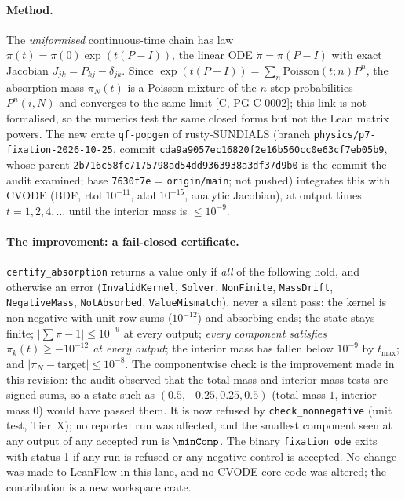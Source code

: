 \documentclass[11pt]{article}
\theoremstyle{remark}
\newcommand{\tier}[1]{\textsf{[#1]}}
\newcommand{\lean}[1]{\texttt{#1}}
\begin{document}
\paragraph{Method.} The \emph{uniformised} continuous-time chain has law $\pi(t)=\pi(0)\exp(t(P-I))$, the linear ODE
$\dot\pi=\pi(P-I)$ with exact Jacobian $J_{jk}=P_{kj}-\delta_{jk}$. Since $\exp(t(P-I))=\sum_n\mathrm{Poisson}(t;n)P^n$,
the absorption mass $\pi_N(t)$ is a Poisson mixture of the $n$-step probabilities $P^n(i,N)$ and converges to the same limit
\tier{C, PG-C-0002}; this link is not formalised, so the numerics test the same closed forms but not the Lean matrix powers.
The new crate \lean{qf-popgen} of rusty-SUNDIALS (branch \texttt{physics/p7-fixation-2026-10-25}, commit
\texttt{cda9a9057ec16820f2e16b560cc0e63cf7eb05b9}, whose parent \texttt{2b716c58fc7175798ad54dd9363938a3df37d9b0} is the commit the audit examined;
base \texttt{7630f7e} = \texttt{origin/main}; not pushed) integrates this with
CVODE (BDF, rtol $10^{-11}$, atol $10^{-15}$, analytic Jacobian), at output times $t=1,2,4,\dots$ until the interior mass is
$\le10^{-9}$.

\paragraph{The improvement: a fail-closed certificate.} \lean{certify\_absorption} returns a value only if \emph{all} of the following hold, and
otherwise an error (\lean{InvalidKernel}, \lean{Solver}, \lean{NonFinite}, \lean{MassDrift}, \lean{NegativeMass}, \lean{NotAbsorbed}, \lean{ValueMismatch}), never a silent pass:
the kernel is non-negative with unit row sums ($10^{-12}$) and absorbing ends; the state stays finite; $|\sum\pi-1|\le10^{-9}$ at every output;
\emph{every component satisfies $\pi_k(t)\ge-10^{-12}$ at every output};
the interior mass has fallen below $10^{-9}$ by $t_{\max}$; and $|\pi_N-\text{target}|\le10^{-8}$.
The componentwise check is the improvement made in this revision: the audit observed that the total-mass and interior-mass tests are signed sums, so a state such as
$(0.5,-0.25,0.25,0.5)$ (total mass $1$, interior mass $0$) would have passed them. It is now refused by \lean{check\_nonnegative} (unit test, Tier~X);
no reported run was affected, and the smallest component seen at any output of any accepted run is $\minComp$. The binary \lean{fixation\_ode} exits
with status 1 if any run is refused or any negative control is accepted. No change was made to LeanFlow in this lane, and no CVODE core code
was altered; the contribution is a new workspace crate.
\end{document}
